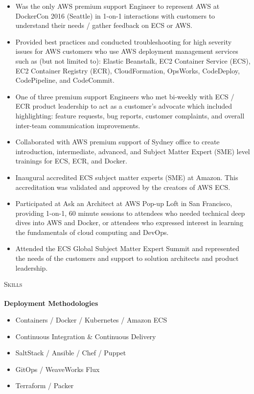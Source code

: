 \documentclass[a4paper]{article}
\newcommand{\lineunder} {
    \vspace*{-8pt} \\
    \hspace*{-18pt} \hrulefill \\
}
\newcommand{\header} [1] {
    {\hspace*{-18pt}\vspace*{6pt} \textsc{#1}}
    \vspace*{-6pt} \lineunder
}
\begin{document}
\begin{itemize} \itemsep 1pt
    \item Was the only AWS premium support Engineer to represent AWS at DockerCon 2016 (Seattle) in 1-on-1 interactions with customers to understand their needs / gather feedback on ECS or AWS.
    \item Provided best practices and conducted troubleshooting for high severity issues for AWS customers who use AWS deployment management services such as (but not limited to): Elastic Beanstalk, EC2 Container Service (ECS), EC2 Container Registry (ECR), CloudFormation, OpsWorks, CodeDeploy, CodePipeline, and CodeCommit.
    \item One of three premium support Engineers who met bi-weekly with ECS / ECR product leadership to act as a customer’s advocate which included highlighting: feature requests, bug reports, customer complaints, and overall inter-team communication improvements.
    \item Collaborated with AWS premium support of Sydney office to create introduction, intermediate, advanced, and Subject Matter Expert (SME) level trainings for ECS, ECR, and Docker.
    \item Inaugural accredited ECS subject matter experts (SME) at Amazon. This accreditation was validated and approved by the creators of AWS ECS. 
    \item Participated at \textquotedbl{}Ask an Architect\textquotedbl{} at AWS Pop-up Loft in San Francisco, providing 1-on-1, 60 minute sessions to attendees who needed technical deep dives into AWS and Docker, or attendees who expressed interest in learning the fundamentals of cloud computing and DevOps.
    \item Attended the ECS Global Subject Matter Expert Summit and represented the needs of the customers and support to solution architects and product leadership.
\end{itemize}

\header{Skills}
\textbf{Deployment Methodologies}\\
\vspace{-1mm}
\begin{itemize} \itemsep 1pt
    \item Containers / Docker / Kubernetes / Amazon ECS
    \item Continuous Integration \& Continuous Delivery
    \item SaltStack / Ansible / Chef / Puppet
    \item GitOps / WeaveWorks Flux
    \item Terraform / Packer
\end{itemize}
\end{document}
